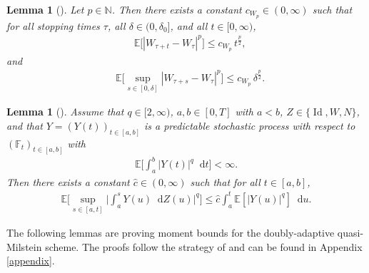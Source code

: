 \documentclass[11pt,a4paper]{article}
\numberwithin{equation}{section}
\newtheorem{lemma}[theorem]{Lemma}
\theoremstyle{definition}
\newcommand{\E}{{\mathbb{E}}}
\newcommand{\N}{{\mathbb{N}}}
\newcommand{\F}{\mathbb{F}}
\newcommand{\diff}{\mathop{}\!\mathrm{d}}
\begin{document}
\begin{lemma}[]\label{LMEW}
Let $p\in\N$. Then there exists a constant $c_{W_p}\in(0,\infty)$ such that for all stopping times $\tau$, all $\delta\in(0,\delta_0]$, and all $t\in[0,\infty)$, 
\begin{equation}\label{MEW}
\begin{aligned}
&\E\big[|W_{\tau+t} - W_\tau|^p\big] \leq c_{W_p} \, t^\frac{p}{2},
\end{aligned}
\end{equation}
and 
\begin{equation}\label{MEW2}
\begin{aligned}
&\E\Big[\sup_{s\in[0,\delta]} |W_{\tau+s} - W_\tau|^p\Big] \leq c_{W_p} \, \delta^\frac{p}{2}.
\end{aligned}
\end{equation}
\end{lemma}

\begin{lemma}[]\label{BDGaKunita}
Assume that $q\in [2,\infty)$, $a,b\in[0,T]$ with $a<b$, $Z\in\{\operatorname{Id},W,N\}$, and that $Y = (Y(t))_{t\in[a,b]}$ is a predictable stochastic process with respect to $(\F_t)_{t\in[a,b]}$ with
\begin{equation}
\begin{aligned}
\E\Big[\int_a^b |Y(t)|^q \diff t\Big] < \infty. 
\end{aligned}
\end{equation}
Then there exists a constant $\hat c\in(0,\infty)$ such that for all $t\in[a,b]$,
\begin{equation}
\begin{aligned}
\E\Big[ \sup_{s\in[a,t]} \Big|\int_a^s Y(u) \diff Z(u)\Big|^q \Big] \leq \hat c \int_a^t \E[|Y(u)|^q]\diff u. 
\end{aligned}
\end{equation}
\end{lemma}

The following lemmas are proving moment bounds for the doubly-adaptive quasi-Milstein scheme. The proofs follow the strategy of \cite[Lemma 3.5 - Lemma 3.7]{PSS2024JMS} and can be found in Appendix \ref{appendix}. 
\end{document}
